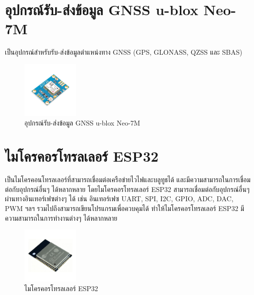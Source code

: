 \section{อุปกรณ์รับ-ส่งข้อมูล GNSS u-blox Neo-7M}
  \cite[อุปกรณ์รับ-ส่งข้อมูล GNSS u-blox Neo-7M]{u-blox-neo-7m} เป็นอุปกรณ์สำหรับรับ-ส่งข้อมูลตำแหน่งทาง GNSS (GPS, GLONASS, QZSS และ SBAS) 
  \begin{figure}[h!]
    \begin{center}
      \includegraphics[width=0.25\textwidth]{u-blox-neo-7m.jpg}
    \end{center}
    \caption[Poem]{อุปกรณ์รับ-ส่งข้อมูล GNSS u-blox Neo-7M}
    \label{fig:u-blox-neo-7m}
  \end{figure}

 \section{ไมโครคอรโทรลเลอร์ ESP32}
  \cite[ไมโครคอรโทรลเลอร์ ESP32]{esp32} เป็นไมโครคอนโทรลเลอร์ที่สามารถเชื่อมต่อเครือข่ายไวไฟและบลูทูธได้ และมีความสามารถในการเชื่อมต่อกับอุปกรณ์อื่นๆ ได้หลากหลาย โดยไมโครคอรโทรลเลอร์ ESP32 สามารถเชื่อมต่อกับอุปกรณ์อื่นๆ ผ่านทางอินเทอร์เฟซต่างๆ ได้ เช่น อินเทอร์เฟซ UART, SPI, I2C, GPIO, ADC, DAC, PWM ฯลฯ รวมไปถึงสามารถเขียนโปรแกรมเพื่อควบคุมได้ ทำให้ไมโครคอรโทรลเลอร์ ESP32 มีความสามารถในการทำงานต่างๆ ได้หลากหลาย
  \begin{figure}[h!]
    \begin{center}
      \includegraphics[width=0.25\textwidth]{esp32.png}
    \end{center}
    \caption[Poem]{ไมโครคอรโทรลเลอร์ ESP32}
    \label{fig:esp32}
  \end{figure}

